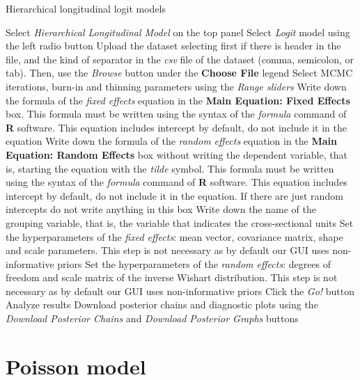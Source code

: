 \begin{algorithm}[h!]
	\caption{Hierarchical longitudinal logit models}\label{alg:HLogit}
	\begin{algorithmic}[1]  		 			
		\State Select \textit{Hierarchical Longitudinal Model} on the top panel
		\State Select \textit{Logit} model using the left radio button
		\State Upload the dataset selecting first if there is header in the file, and the kind of separator in the \textit{csv} file of the dataset (comma, semicolon, or tab). Then, use the \textit{Browse} button under the \textbf{Choose File} legend
		\State Select MCMC iterations, burn-in and thinning parameters using the \textit{Range sliders}
		\State Write down the formula of the \textit{fixed effects} equation in the \textbf{Main Equation: Fixed Effects} box. This formula must be written using the syntax of the \textit{formula} command of \textbf{R} software. This equation includes intercept by default, do not include it in the equation
		\State Write down the formula of the \textit{random effects} equation in the \textbf{Main Equation: Random Effects} box without writing the dependent variable, that is, starting the equation with the \textit{tilde} symbol. This formula must be written using the syntax of the \textit{formula} command of \textbf{R} software. This equation includes intercept by default, do not include it in the equation. If there are just random intercepts do not write anything in this box
		\State Write down the name of the grouping variable, that is, the variable that indicates the cross-sectional units 
		\State Set the hyperparameters of the \textit{fixed effects}: mean vector, covariance matrix, shape and scale parameters. This step is not necessary as by default our GUI uses non-informative priors
		\State Set the hyperparameters of the \textit{random effects}: degrees of freedom and scale matrix of the inverse Wishart distribution. This step is not necessary as by default our GUI uses non-informative priors
		\State Click the \textit{Go!} button
		\State Analyze results
		\State Download posterior chains and diagnostic plots using the \textit{Download Posterior Chains} and \textit{Download Posterior Graphs} buttons
	\end{algorithmic} 
\end{algorithm}

\section{Poisson model}\label{sec93}

